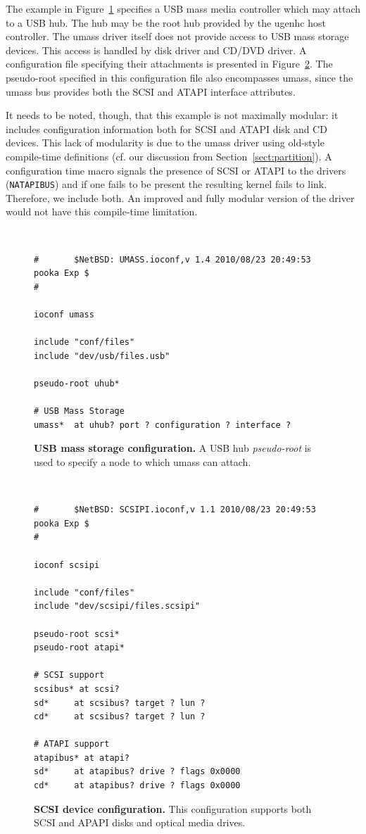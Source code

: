 The example in Figure~\ref{fig:umassconf} specifies a USB mass
media controller which may attach to a USB hub.  The hub may be
the root hub provided by the ugenhc host controller.  The umass
driver itself does not provide access to USB mass storage devices.
This access is handled by disk driver and CD/DVD driver.  A configuration
file specifying their attachments is presented in
Figure~\ref{fig:scsipiconf}.  The pseudo-root specified in this
configuration file also encompasses umass, since the umass bus
provides both the SCSI and ATAPI interface attributes.

It needs to be noted, though, that this example is not maximally
modular: it includes configuration information both for SCSI and
ATAPI disk and CD devices.  This lack of modularity is due to the umass driver using
old-style compile-time definitions (cf. our discussion from
Section~\ref{sect:partition}).  A configuration time macro signals
the presence of SCSI or ATAPI to the drivers (\eg \texttt{NATAPIBUS})
and if one fails to be present the resulting kernel fails to link.
Therefore, we include both.  An improved and fully modular version
of the driver would not have this compile-time limitation.

\begin{figure}
{\tt \scriptsize
\begin{verbatim}
#       $NetBSD: UMASS.ioconf,v 1.4 2010/08/23 20:49:53 pooka Exp $
#

ioconf umass

include "conf/files"
include "dev/usb/files.usb"

pseudo-root uhub*

# USB Mass Storage
umass*  at uhub? port ? configuration ? interface ?
\end{verbatim}}
\caption[USB mass storage configuration]{
\textbf{USB mass storage configuration.}
A USB hub \textit{pseudo-root} is used to specify a node to which umass
can attach.
}
\label{fig:umassconf}
\end{figure}

\begin{figure}
{\tt \scriptsize
\begin{verbatim}
#       $NetBSD: SCSIPI.ioconf,v 1.1 2010/08/23 20:49:53 pooka Exp $
#

ioconf scsipi

include "conf/files"
include "dev/scsipi/files.scsipi"

pseudo-root scsi*
pseudo-root atapi*

# SCSI support
scsibus* at scsi?
sd*     at scsibus? target ? lun ?
cd*     at scsibus? target ? lun ? 

# ATAPI support
atapibus* at atapi?
sd*     at atapibus? drive ? flags 0x0000 
cd*     at atapibus? drive ? flags 0x0000
\end{verbatim}}
\caption[SCSI device configuration]{
\textbf{SCSI device configuration.}
This configuration supports both SCSI and APAPI disks and optical
media drives.
}
\label{fig:scsipiconf}
\end{figure}


